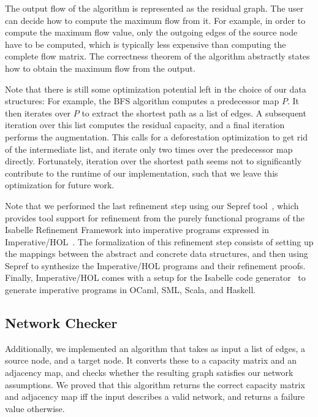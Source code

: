 \documentclass{llncs}
\begin{document}
  The output flow of the algorithm is represented as the residual graph. The user can decide how to compute the maximum flow from it. For example,
  in order to compute the maximum flow value, only the outgoing edges of the source node have to be computed, which is typically less 
  expensive than computing the complete flow matrix. The correctness theorem of the algorithm abstractly states how to obtain the maximum flow from the output.

  Note that there is still some optimization potential left in the choice of our data structures: 
  For example, the BFS algorithm computes a predecessor map $P$. It then iterates over $P$ to extract the shortest path as a list of edges.
  A subsequent iteration over this list computes the residual capacity, and a final iteration performs the augmentation. 
  This calls for a deforestation optimization to get rid of the intermediate list, and iterate only two times over the predecessor map directly.
  Fortunately, iteration over the shortest path seems not to significantly contribute to the runtime of our implementation, such that 
  we leave this optimization for future work.

  Note that we performed the last refinement step using our Sepref tool~\cite{La15,La16}, which provides tool support for refinement from the
  purely functional programs of the Isabelle Refinement Framework into imperative programs expressed in Imperative/HOL~\cite{BKHEM08}.
  The formalization of this refinement step consists of setting up the mappings between the abstract and concrete data structures,
  and then using Sepref to synthesize the Imperative/HOL programs and their refinement proofs.
  Finally, Imperative/HOL comes with a setup for the Isabelle code generator~\cite{Haft09,HaNi10} to generate imperative programs in OCaml, SML, Scala, and Haskell.

  \subsection{Network Checker}
  Additionally, we implemented an algorithm that takes as input a list of edges, a source node, and a target node.
  It converts these to a capacity matrix and an adjacency map, and checks whether the resulting graph satisfies our network assumptions.
  We proved that this algorithm returns the correct capacity matrix and adjacency map iff the input describes a valid network,
  and returns a failure value otherwise.
    
\end{document}
